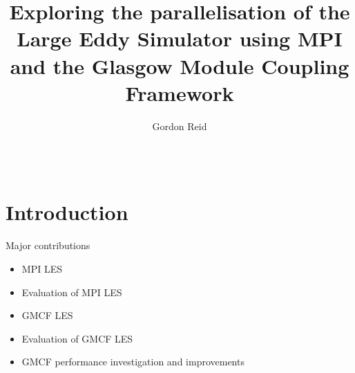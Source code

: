 \documentclass{acm_proc_article-sp}
\title{Exploring the parallelisation of the Large Eddy Simulator using MPI and
the Glasgow Module Coupling Framework}
\author{
    \alignauthor
    Gordon Reid\\
    \affaddr{School of Computing Science}\\
    \affaddr{University of Glasgow}\\
    \email{1002536r@student.gla.ac.uk}
}
\begin{document}
\maketitle

\begin{abstract}

\end{abstract}

\section{Introduction}

Major contributions

\begin{itemize}
    \item MPI LES
    \item Evaluation of MPI LES
    \item GMCF LES
    \item Evaluation of GMCF LES
    \item GMCF performance investigation and improvements
\end{itemize}



\end{document}
